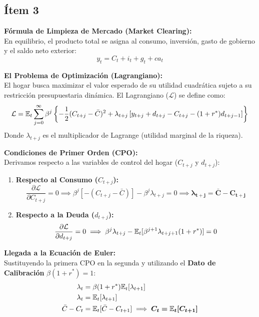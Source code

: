 \subsection*{Ítem 3}

\textbf{Fórmula de Limpieza de Mercado (Market Clearing):} \\
En equilibrio, el producto total se asigna al consumo, inversión, gasto de gobierno y el saldo neto exterior:
\begin{equation}
    y_t = C_t + i_t + g_t + ca_t
\end{equation}

\textbf{El Problema de Optimización (Lagrangiano):} \\
El hogar busca maximizar el valor esperado de su utilidad cuadrática sujeto a su restricción presupuestaria dinámica. El Lagrangiano ($\mathcal{L}$) se define como:
\begin{equation}
    \mathcal{L} = \mathbb{E}_t \sum_{j=0}^{\infty} \beta^j \left\{ -\frac{1}{2}(C_{t+j} - \bar{C})^2 + \lambda_{t+j} \left[ y_{t+j} + d_{t+j} - C_{t+j} - (1+r^*)d_{t+j-1} \right] \right\}
\end{equation}
Donde $\lambda_{t+j}$ es el multiplicador de Lagrange (utilidad marginal de la riqueza).

\textbf{Condiciones de Primer Orden (CPO):} \\
Derivamos respecto a las variables de control del hogar ($C_{t+j}$ y $d_{t+j}$):
\begin{enumerate}
    \item \textbf{Respecto al Consumo ($C_{t+j}$):} 
    \begin{equation}
        \frac{\partial \mathcal{L}}{\partial C_{t+j}} = 0 \implies \beta^j [-(C_{t+j} - \bar{C})] - \beta^j \lambda_{t+j} = 0 \implies \bm{\lambda_{t+j} = \bar{C} - C_{t+j}}
    \end{equation}
    \item \textbf{Respecto a la Deuda ($d_{t+j}$):} 
    \begin{equation}
        \frac{\partial \mathcal{L}}{\partial d_{t+j}} = 0 \implies \beta^j \lambda_{t+j} - \mathbb{E}_t[\beta^{j+1} \lambda_{t+j+1}(1+r^*)] = 0
    \end{equation}
\end{enumerate}

\textbf{Llegada a la Ecuación de Euler:} \\
Sustituyendo la primera CPO en la segunda y utilizando el \textbf{Dato de Calibración} $\beta(1+r^*) = 1$:
\begin{align}
    \lambda_t &= \beta(1+r^*) \mathbb{E}_t[\lambda_{t+1}] \\
    \lambda_t &= \mathbb{E}_t[\lambda_{t+1}] \\
    \bar{C} - C_t &= \mathbb{E}_t[\bar{C} - C_{t+1}] \implies \bm{C_t = \mathbb{E}_t[C_{t+1}]}
\end{align}

